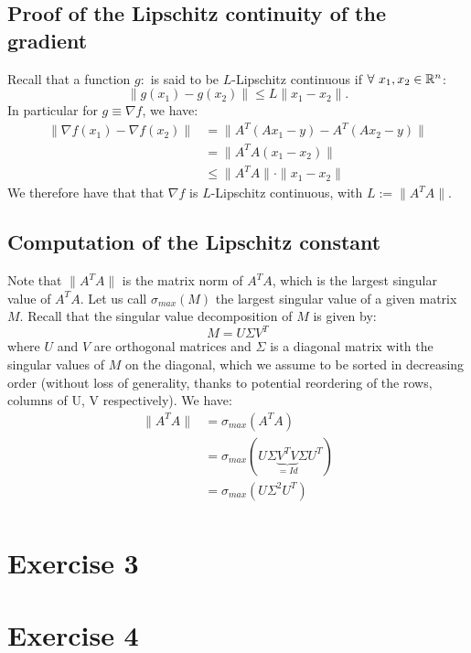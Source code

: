 \documentclass[12pt]{article}
\begin{document}
\subsection{Proof of the Lipschitz continuity of the gradient}
Recall that a function $g: $ is said to be $L$-Lipschitz continuous if $\forall\ x_1, x_2 \in \mathbb{R}^n$:
\begin{equation}
  \|g(x_1) - g(x_2)\| \leq L \|x_1 - x_2\|.
\end{equation}
In particular for $g \equiv \nabla f$, we have:
\begin{align*}
  \| \nabla f (x_1) - \nabla f (x_2) \|
   & = \| A^T(Ax_1 - y) - A^T(Ax_2 - y) \|  \\
   & = \| A^T A(x_1 - x_2) \|               \\
   & \leq \| A^T A \| \cdot \| x_1 - x_2 \|
\end{align*}
We therefore have that that $\nabla f$ is $L$-Lipschitz continuous, with $L := \| A^T A \|$.

\subsection{Computation of the Lipschitz constant}
Note that $\| A^T A \|$ is the matrix norm of $A^T A$, which is the largest singular value of $A^T A$. Let us call $\sigma_{max}(M)$ the largest singular value of a given matrix $M$. Recall that the singular value decomposition of $M$ is given by:
\begin{equation}
  M = U \Sigma V^T
\end{equation}
where $U$ and $V$ are orthogonal matrices and $\Sigma$ is a diagonal matrix with the singular values of $M$ on the diagonal, which we assume to be sorted in decreasing order (without loss of generality, thanks to potential reordering of the rows, columns of U, V respectively). We have:
\begin{align*}
  \| A^T A \|
   & = \sigma_{max}(A^T A)                                        \\
   & = \sigma_{max}(U \Sigma \underbrace{V^T V}_{=Id} \Sigma U^T) \\
   & = \sigma_{max}(U \Sigma^2 U^T)                               \\
\end{align*}





\section{Exercise 3}
\section{Exercise 4}


\end{document}
